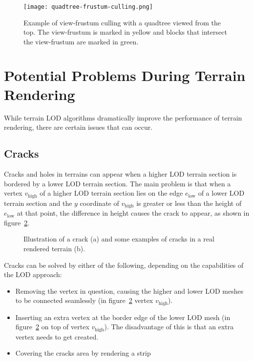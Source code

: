 \begin{figure}[H]
  \centering
  \texttt{[image: quadtree-frustum-culling.png]}
  \caption{Example of view-frustum culling with a quadtree viewed from the top. The view-frustum is marked in yellow and blocks that intersect the view-frustum are marked in green.}\label{fig:quadtree-frustum-culling}
\end{figure}

\section{Potential Problems During Terrain Rendering}
While terrain LOD algorithms dramatically improve the performance of terrain rendering, 
there are certain issues that can occur. 

\subsection{Cracks}
Cracks and holes in terrains can appear when a higher LOD terrain section is bordered 
by a lower LOD terrain section. The main problem is that when a vertex $v_{\text{high}}$ of a higher LOD terrain section lies on the edge $e_{\text{low}}$
of a lower LOD terrain section and the $y$ coordinate of $v_{\text{high}}$ is greater or less than the 
height of $e_{\text{low}}$ at that point, the difference in height causes the crack to appear, as shown in figure~\ref{fig:crack-example}.
\begin{figure}[H]
  \centering
  \qquad
  \caption{Illustration of a crack (a) and some examples of cracks in a real rendered terrain (b).}\label{fig:crack-example}
\end{figure}
Cracks can be solved by either of the following, depending on the capabilities of the LOD approach:
\begin{itemize}
  \item Removing the vertex in question, causing the higher and lower LOD meshes to be connected seamlessly (in figure~\ref{fig:crack-example} vertex $v_{\text{high}}$).
  \item Inserting an extra vertex at the border edge of the lower LOD mesh \cite[p.~194]{lodfor3dgraphics} (in figure~\ref{fig:crack-example} on top of vertex $v_{\text{high}}$). The disadvantage of this is that an extra vertex needs to get created.
  \item Covering the cracks area by rendering a strip \cite{gpugeomclipmaps}
\end{itemize}

